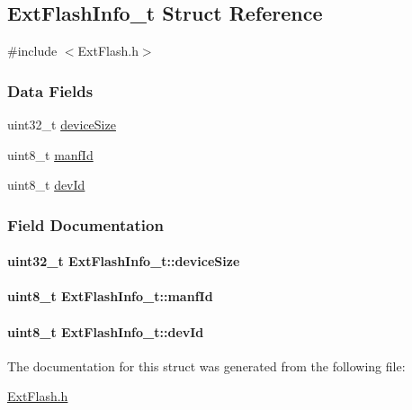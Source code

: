 \subsection{Ext\+Flash\+Info\+\_\+t Struct Reference}
\label{struct_ext_flash_info__t}


{\ttfamily \#include $<$Ext\+Flash.\+h$>$}

\subsubsection*{Data Fields}
\begin{DoxyCompactItemize}
\item 
uint32\+\_\+t \hyperlink{struct_ext_flash_info__t_ae99d0fb5622c13caa244c7ba01f9afb7}{device\+Size}
\item 
uint8\+\_\+t \hyperlink{struct_ext_flash_info__t_a57534218f8f86136c43f0b23bbc50c52}{manf\+Id}
\item 
uint8\+\_\+t \hyperlink{struct_ext_flash_info__t_a1e29a0820f2c593d8c0b2f3290f25f7a}{dev\+Id}
\end{DoxyCompactItemize}


\subsubsection{Field Documentation}
\paragraph[{device\+Size}]{\setlength{\rightskip}{0pt plus 5cm}uint32\+\_\+t Ext\+Flash\+Info\+\_\+t\+::device\+Size}\label{struct_ext_flash_info__t_ae99d0fb5622c13caa244c7ba01f9afb7}
\paragraph[{manf\+Id}]{\setlength{\rightskip}{0pt plus 5cm}uint8\+\_\+t Ext\+Flash\+Info\+\_\+t\+::manf\+Id}\label{struct_ext_flash_info__t_a57534218f8f86136c43f0b23bbc50c52}
\paragraph[{dev\+Id}]{\setlength{\rightskip}{0pt plus 5cm}uint8\+\_\+t Ext\+Flash\+Info\+\_\+t\+::dev\+Id}\label{struct_ext_flash_info__t_a1e29a0820f2c593d8c0b2f3290f25f7a}


The documentation for this struct was generated from the following file\+:\begin{DoxyCompactItemize}
\item 
\hyperlink{_ext_flash_8h}{Ext\+Flash.\+h}\end{DoxyCompactItemize}

